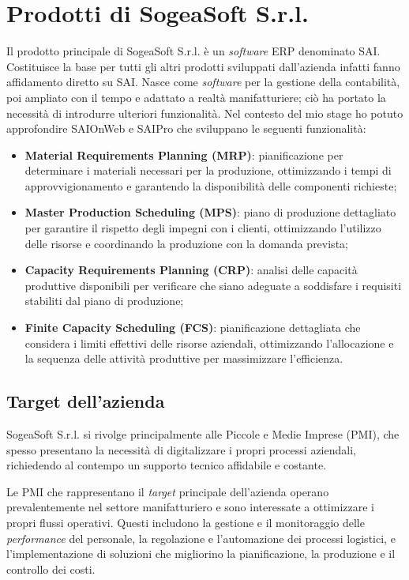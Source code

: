     \section{Prodotti di SogeaSoft S.r.l.}

    Il prodotto principale di SogeaSoft S.r.l. è un \textit{software} ERP denominato SAI. Costituisce la base per tutti gli altri prodotti sviluppati dall'azienda infatti fanno affidamento diretto su SAI. Nasce come \textit{software} per la gestione della contabilità, poi ampliato con il tempo e adattato a realtà manifatturiere; ciò ha portato la necessità di introdurre ulteriori funzionalità. 
    Nel contesto del mio stage ho potuto approfondire SAIOnWeb e SAIPro che sviluppano le seguenti funzionalità:
    \begin{itemize}
        \item \textbf{Material Requirements Planning (MRP)}: pianificazione per determinare i materiali necessari per la produzione, ottimizzando i tempi di approvvigionamento e garantendo la disponibilità delle componenti richieste;
        \item \textbf{Master Production Scheduling (MPS)}: piano di produzione dettagliato per garantire il rispetto degli impegni con i clienti, ottimizzando l’utilizzo delle risorse e coordinando la produzione con la domanda prevista;
        \item \textbf{Capacity Requirements Planning (CRP)}: analisi delle capacità produttive disponibili per verificare che siano adeguate a soddisfare i requisiti stabiliti dal piano di produzione;
        \item \textbf{Finite Capacity Scheduling (FCS)}: pianificazione dettagliata che considera i limiti effettivi delle risorse aziendali, ottimizzando l'allocazione e la sequenza delle attività produttive per massimizzare l'efficienza.       
    \end{itemize}
    
        \subsection{Target dell'azienda}
        SogeaSoft S.r.l. si rivolge principalmente alle Piccole e Medie Imprese (PMI), che spesso presentano la necessità di digitalizzare i propri processi aziendali, richiedendo al contempo un supporto tecnico affidabile e costante.  
        
        \noindent Le PMI che rappresentano il \textit{target} principale dell’azienda operano prevalentemente nel settore manifatturiero e sono interessate a ottimizzare i propri flussi operativi. Questi includono la gestione e il monitoraggio delle \textit{performance} del personale, la regolazione e l’automazione dei processi logistici, e l’implementazione di soluzioni che migliorino la pianificazione, la produzione e il controllo dei costi.
        
